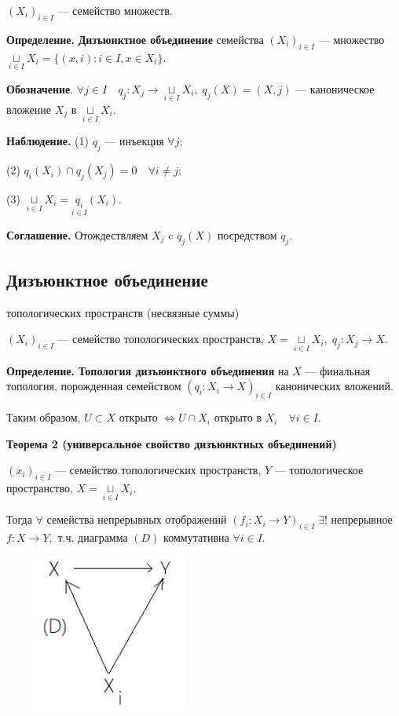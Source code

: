 \documentclass[12pt,a4paper]{article}
\begin{document}
$(X_{i})_{i \in I}$ --- семейство множеств. 

\textbf{Определение.} \textbf{Дизъюнктное объединение} семейства $(X_{i})_{i \in I}$ --- множество $\underset{i \in I}{\sqcup} X_{i} = \{(x, i): i \in I, x \in X_{i}\}.$ 

\textbf{Обозначение}. $\forall j \in I \quad q_{j}: X_{j} \to \underset{i \in I}{\sqcup} X_{i}, \; q_{j}(X) = (X, j)$ --- каноническое вложение $X_{j}$ в $\underset{i \in I}{\sqcup} X_{i}.$ 

\textbf{Наблюдение.} (1) $q_{j}$ --- инъекция $\forall j;$ 

(2) $q_{i} (X_{i}) \cap q_{j}(X_{j}) = 0 \quad \forall i \neq j;$

(3) $\underset{i \in I}{\sqcup} X_{i} = \underset{i \in I}{q_{i}} (X_{i}).$

\textbf{Соглашение.} Отождествляем $X_{j}$ c $q_{j}(X)$ посредством $q_{j}.$

\subsection{Дизъюнктное объединение} топологических пространств (несвязные суммы)

$(X_{i})_{i \in I}$ --- семейство топологических пространств, $X = \underset{i \in I}{\sqcup} X_{i}, \; q_{j}: X_{j} \to X.$

\textbf{Определение.} \textbf{Топология дизъюнктного объединения} на $X$ --- финальная топология, порожденная семейством $(q_{i}: X_{i} \to X)_{i \in I}$ канонических вложений.

Таким образом, $U \subset X$ открыто $\Leftrightarrow U \cap X_{i}$ открыто в $X_{i} \quad \forall i \in I.$ 

\textbf{Теорема 2 (универсальное свойство дизъюнктных объединений)}

$(x_{i})_{i \in I}$ --- семейство топологических пространств, $Y$ --- топологическое пространство, $X = \underset{i \in I}{\sqcup} X_{i}.$ 

Тогда $\forall$ семейства непрерывных отображений $(f_{i}: X_{i} \to Y)_{i \in I} \; \exists !$ непрерывное $f: X \to Y,$ т.ч. диаграмма $(D)$ коммутативна $\forall i \in I.$ 

\begin{figure}
	\includegraphics[width = 5cm]{lect7_3.png}
\end{figure}
\end{document}
